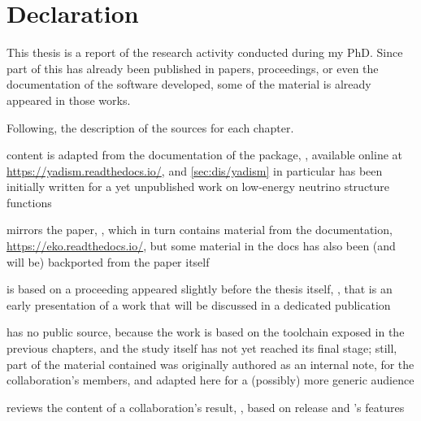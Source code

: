

\chapter*{Declaration}
%
	{}

\noindent
This thesis is a report of the research activity conducted during my PhD.
%
Since part of this has already been published in papers, proceedings, or even
the documentation of the software developed, some of the material is already
appeared in those works.

Following, the description of the sources for each chapter.
\begin{description}[font=\normalfont\sffamily\scshape,leftmargin=2cm,style=nextline]
  \item[\cref{ch:dis}] content is adapted from the documentation of the \yadism
    package, \cite{candido_alessandro_2022_6285149}, available online at
    \url{https://yadism.readthedocs.io/}, and \cref{sec:dis/yadism} in
    particular has been initially written for a yet unpublished work on
    low-energy neutrino structure functions
  \item[\cref{ch:eko}]  mirrors the \eko paper, \cite{Candido:2022tld}, which
    in turn contains material from the \eko documentation,
    \url{https://eko.readthedocs.io/}, but some material in the docs has also
    been (and will be) backported from the paper itself
  \item[\cref{ch:pine}] is based on a proceeding appeared slightly before the
    thesis itself, \cite{Barontini:2022jci}, that is an early presentation of a
    work that will be discussed in a dedicated publication
  \item[\cref{ch:mhou}] has no public source, because the work is based on the
    toolchain exposed in the previous chapters, and the study itself has not
    yet reached its final stage; still, part of the material contained was
    originally authored as an internal note, for the \nnpdf collaboration's
    members, and adapted here for a (possibly) more generic audience
  \item[\cref{ch:ic}] reviews the content of a collaboration's result,
    \cite{Ball:2022qks}, based on  release and \eko's features
  \item[\cref{ch:afb}]
  \item[\cref{ch:pos}]
  \item[\cref{ch:gp}]
\end{description}
